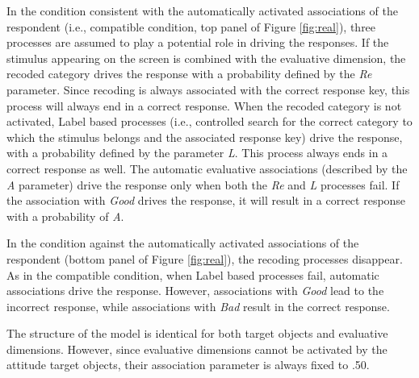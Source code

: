 \documentclass[12pt]{book}
\begin{document}


In the condition consistent with the automatically activated associations of the respondent (i.e., compatible condition, top panel of Figure \ref{fig:real}), three processes are assumed to play a potential role in driving the responses. 
If the stimulus appearing on the screen is combined with the evaluative dimension, the recoded category drives the response with a probability defined by the \emph{Re} parameter. Since recoding is always associated with the correct response key, this process will always end in a correct response. 
When the recoded category is not activated, Label based processes (i.e., controlled search for the correct category to which the stimulus belongs and the associated response key) drive the response, with a probability defined by the parameter \emph{L}. This process always ends in a correct response as well. 
The automatic evaluative associations (described by the \emph{A} parameter) drive the response only when both the \emph{Re} and \emph{L} processes fail. If the association with \emph{Good} drives the response, it will result in a correct response with a probability of \emph{A}.

In the condition against the automatically activated associations of the respondent (bottom panel of Figure \ref{fig:real}), the recoding processes disappear. 
As in the compatible condition, when Label based processes fail, automatic associations drive the response. However, associations with \emph{Good} lead to the incorrect response, while associations with \emph{Bad} result in the correct response.

The structure of the model is identical for both target objects and evaluative dimensions. However, since evaluative dimensions cannot be activated by the attitude target objects, their association parameter is always fixed to .50.
\end{document}
